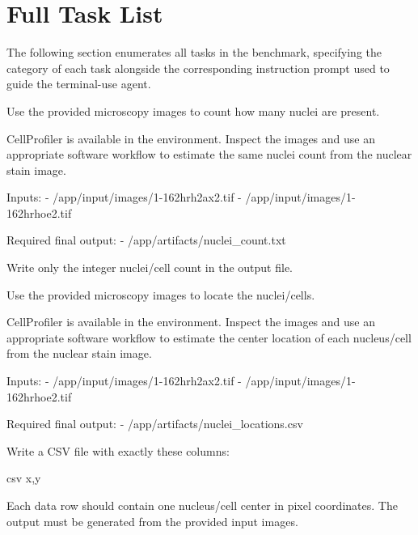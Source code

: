 \clearpage
\newpage
\section{Full Task List}

The following section enumerates all tasks in the benchmark, specifying the category of each task alongside the corresponding instruction prompt used to guide the terminal-use agent.

\begin{instructionbox}
Use the provided microscopy images to count how many nuclei are present.

CellProfiler is available in the environment. Inspect the images and use an appropriate software workflow to estimate the same nuclei count from the nuclear stain image.

Inputs:
- \textasciigrave{}/app/input/images/1-162hrh2ax2.tif\textasciigrave{}
- \textasciigrave{}/app/input/images/1-162hrhoe2.tif\textasciigrave{}

Required final output:
- \textasciigrave{}/app/artifacts/nuclei\_count.txt\textasciigrave{}

Write only the integer nuclei/cell count in the output file.
\end{instructionbox}

\begin{instructionbox}
Use the provided microscopy images to locate the nuclei/cells.

CellProfiler is available in the environment. Inspect the images and use an appropriate software workflow to estimate the center location of each nucleus/cell from the nuclear stain image.

Inputs:
- \textasciigrave{}/app/input/images/1-162hrh2ax2.tif\textasciigrave{}
- \textasciigrave{}/app/input/images/1-162hrhoe2.tif\textasciigrave{}

Required final output:
- \textasciigrave{}/app/artifacts/nuclei\_locations.csv\textasciigrave{}

Write a CSV file with exactly these columns:

\textasciigrave{}\textasciigrave{}\textasciigrave{}csv
x,y
\textasciigrave{}\textasciigrave{}\textasciigrave{}

Each data row should contain one nucleus/cell center in pixel coordinates. The output must be generated from the provided input images.
\end{instructionbox}

